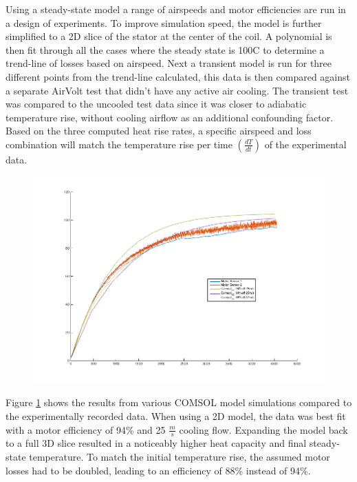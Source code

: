 \documentclass[]{aiaa-tc}%
\begin{document}
Using a steady-state model a range of airspeeds and motor efficiencies are run in a design of experiments. To improve simulation speed, the model is further simplified to a 2D slice of the stator at the center of the coil. A polynomial is then fit through all the cases where the steady state is 100C to determine a trend-line of losses based on airspeed.
Next a transient model is run for three different points from the trend-line calculated, this data is then compared against a separate AirVolt test that didn't have any active air cooling. The transient test was compared to the uncooled test data since it was closer to adiabatic temperature rise, without cooling airflow as an additional confounding factor. Based on the three computed heat rise rates, a specific airspeed and loss combination will match the temperature rise per time $(\frac{dT}{dt})$ of the experimental data.

\begin{figure}[!h]%
	\centering
	\includegraphics[width=1.0\textwidth]{figures/Temp_motor_1012_0929.png}
	\caption{}
	\label{fig:COMSOLresults}
\end{figure}

Figure \ref{fig:COMSOLresults} shows the results from various COMSOL model simulations compared to the experimentally recorded data. When using a 2D model, the data was best fit with a motor efficiency of 94\% and 25 $\frac{m}{s}$ cooling flow. Expanding the model back to a full 3D slice resulted in a noticeably higher heat capacity and final steady-state temperature. To match the initial temperature rise, the assumed motor losses had to be doubled, leading to an efficiency of 88\% instead of 94\%.
\end{document}
